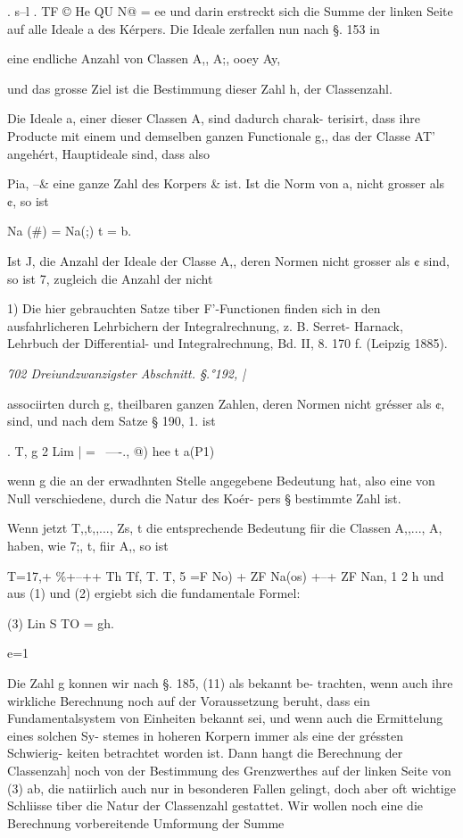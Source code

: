 \documentclass[12pt,a4paper]{article}
\theoremstyle{plain}
\theoremstyle{definition}
\begin{document}
. s--l . TF © He QU N@ = ee und darin erstreckt sich die Summe der linken Seite auf alle Ideale a des Kérpers. Die Ideale zerfallen nun nach §. 153 in

eine endliche Anzahl von Classen A,, A;, ooey Ay,

und das grosse Ziel ist die Bestimmung dieser Zahl h, der Classenzahl.

Die Ideale a, einer dieser Classen A, sind dadurch charak- terisirt, dass ihre Producte mit einem und demselben ganzen Functionale g,, das der Classe AT' angehért, Hauptideale sind, dass also

Pia, --\& eine ganze Zahl des Korpers \& ist. Ist die Norm von a, nicht grosser als ¢, so ist

Na (\#) = Na(;) t = b.

Ist J, die Anzahl der Ideale der Classe A,, deren Normen nicht grosser als ¢ sind, so ist 7, zugleich die Anzahl der nicht

1) Die hier gebrauchten Satze tiber F'-Functionen finden sich in den ausfahrlicheren Lehrbichern der Integralrechnung, z. B. Serret- Harnack, Lehrbuch der Differential- und Integralrechnung, Bd. II, 8. 170 f. (Leipzig 1885).

\vspace{0.5\baselineskip}\noindent\textit{702 Dreiundzwanzigster Abschnitt. §.°192, |}\par

associirten durch g, theilbaren ganzen Zahlen, deren Normen nicht grésser als ¢, sind, und nach dem Satze § 190, 1. ist

. T, g 2 Lim | = ~----., @) hee t a(P1)

wenn g die an der erwadhnten Stelle angegebene Bedeutung hat, also eine von Null verschiedene, durch die Natur des Koér- pers § bestimmte Zahl ist.

Wenn jetzt T,,t,,..., Zs, t die entsprechende Bedeutung fiir die Classen A,,..., A, haben, wie 7;, t, fiir A,, so ist

T=17,+ \%+--++ Th Tf, T. T, 5 =F No) + ZF Na(os) +--+ ZF Nan, 1 2 h und aus (1) und (2) ergiebt sich die fundamentale Formel:

(3) Lin S TO = gh.

e=1

Die Zahl g konnen wir nach §. 185, (11) als bekannt be- trachten, wenn auch ihre wirkliche Berechnung noch auf der Voraussetzung beruht, dass ein Fundamentalsystem von Einheiten bekannt sei, und wenn auch die Ermittelung eines solchen Sy- stemes in hoheren Korpern immer als eine der gréssten Schwierig- keiten betrachtet worden ist. Dann hangt die Berechnung der Classenzah] noch von der Bestimmung des Grenzwerthes auf der linken Seite von (3) ab, die natiirlich auch nur in besonderen Fallen gelingt, doch aber oft wichtige Schliisse tiber die Natur der Classenzahl gestattet. Wir wollen noch eine die Berechnung vorbereitende Umformung der Summe
\end{document}
